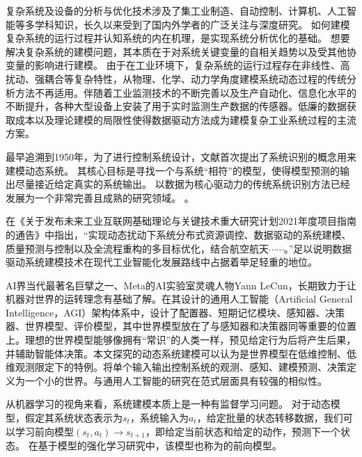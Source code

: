 
复杂系统及设备的分析与优化技术涉及了集工业制造、自动控制、计算机、人工智能等多学科知识，长久以来受到了国内外学者的广泛关注与深度研究。
如何建模复杂系统的运行过程并认知系统的内在机理，是实现系统分析优化的基础。
想要解决复杂系统的建模问题，其本质在于对系统关键变量的自相关趋势以及受其他协变量的影响进行建模。
由于在工业环境下，复杂系统的运行过程存在非线性、高扰动、强耦合等复杂特性，从物理、化学、动力学角度建模系统动态过程的传统分析方法不再适用。伴随着工业监测技术的不断完善以及生产自动化、信息化水平的不断提升，各种大型设备上安装了用于实时监测生产数据的传感器。低廉的数据获取成本以及理论建模的局限性使得数据驱动方法成为建模复杂工业系统过程的主流方案。

最早追溯到1950年，为了进行控制系统设计，文献\cite{zadeh1956identification}首次提出了系统识别的概念用来建模动态系统。
其核心目标是寻找一个与系统“相符”的模型，使得模型预测的输出尽量接近给定真实的系统输出。
以数据为核心驱动力的传统系统识别方法已经发展为一个非常完善且成熟的研究领域。
\cite{le2013system,gevers2006personal,ljung2008perspectives,ljung2011four,Ljung2020}。

在《关于发布未来工业互联网基础理论与关键技术重大研究计划2021年度项目指南的通告》中指出，“实现动态扰动下系统分布式资源调控、数据驱动的系统建模、质量预测与控制以及全流程重构的多目标优化，结合航空航天$\cdots\cdots$。”足以说明数据驱动系统建模技术在现代工业智能化发展路线中占据着举足轻重的地位。

AI界当代最著名巨擘之一、Meta的AI实验室灵魂人物Yann LeCun，长期致力于让机器对世界的运转理念有基础了解。在其设计的通用人工智能（Artificial General Intelligence，AGI）架构体系中，设计了配置器、短期记忆模块、感知器、决策器、世界模型、评价模型，其中世界模型放在了与感知器和决策器同等重要的位置上。理想的世界模型能够像拥有“常识”的人类一样，预见给定行为后将产生后果，并辅助智能体决策。本文探究的动态系统建模可以认为是世界模型在低维控制、低维观测限定下的特例。将单个输入输出控制系统的观测、感知、建模预测、决策定义为一个小的世界。与通用人工智能的研究在范式层面具有较强的相似性。

从机器学习的视角来看，系统建模本质上是一种有监督学习问题\cite{jordan1992forward}。
对于动态模型，假定其系统状态表示为$s_t$，系统输入为$a_t$，给定批量的状态转移数据，我们可以学习前向模型$\left(s_t, a_t\right) \rightarrow s_{t+1}$，即给定当前状态和给定的动作，预测下一个状态。
在基于模型的强化学习研究中，该模型也称为的前向模型。

